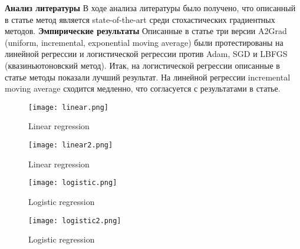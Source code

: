 \documentclass[oneside,final,12pt]{article}
\begin{document}
\break\noindent\textbf{\Large{Анализ литературы}}\newline\break
В ходе анализа литературы было получено, что описанный в статье метод является state-of-the-art среди стохастических градиентных методов.\newline
\break\noindent\textbf{\Large{Эмпирические результаты}}\newline\break
Описанные в статье три версии A2Grad (uniform, incremental, exponential moving average)  были протестированы на линейной регрессии и логистической регрессии против Adam, SGD и LBFGS (квазиньютоновский метод). Итак, на логистической регрессии описанные в статье методы показали лучший результат. На линейной регрессии incremental moving average сходится медленно, что согласуется с результатами в статье.
\begin{figure}[h!]
    \centering
    \texttt{[image: linear.png]}
    \caption{Linear regression}
    \label{fig:lin}
\end{figure}
\begin{figure}[h!]
    \centering
    \texttt{[image: linear2.png]}
    \caption{Linear regression}
    \label{fig:lin}
\end{figure}
\begin{figure}[h!]
    \centering
    \texttt{[image: logistic.png]}
    \caption{Logistic regression}
    \label{fig:log}
\end{figure}
\begin{figure}[h!]
    \centering
    \texttt{[image: logistic2.png]}
    \caption{Logistic regression}
    \label{fig:log}
\end{figure}
\end{document}
